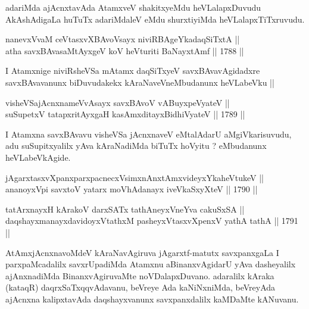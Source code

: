 \begin{artha}
adariMda ajAcnxtavAda AtamxveV shakitxyeMdu heVLalapxDuvudu
AkAshAdigaLa huTuTx adariMdaleV eMdu shurxtiyiMda heVLalapxTiTxruvudu.
\end{artha}



\begin{shl}
nanevxVvaM ceVtasxvXBAvoV\s sayx niviRBAgeYkadaqSiTxtA || \\
atha savxBAvasaMtAyxgeV koV heVturiti BaNayxtAmf ||  1788 ||  
\end{shl}

\begin{artha}
I Atamxnige niviRsheVSa mAtamx daqSiTxyeV savxBAvavAgidadxre
savxBAvavanunx biDuvudakekx kAraNaveVneMbudanunx heVLabeVku ||
\end{artha}

\begin{shl}
visheVSajAcnxnameVvAsayx savxBAvoV vA\s BuyxpeVyateV || \\
suSupetxV tatapxritAyxgaH kasAmxditayxBidhiVyateV ||  1789 ||  
\end{shl}

\begin{artha}
I Atamxna savxBAvavu visheVSa jAcnxnaveV eMtalAdarU aMgiVkarisuvudu,
adu suSupitxyalilx yAva kAraNadiMda biTuTx hoVyitu ? eMbudanunx
heVLabeVkAgide.
\end{artha}


\begin{shl}
jAgarxtasxvXpanxparxpacnecxV\s simxnAnxtAmxvideyxYkaheVtukeV || \\
ananoyxV\s pi savxtoV yatarx moVhAdanayx iveVkaSxyXteV ||  1790 ||  
\end{shl}

\begin{shl}
tatArxnayxH kArakoV darxSATx tathA\s neyxVneYva cakuSxSA || \\
daqshayxmanayxdavidoyxVtathxM pasheyxVtasxvXpenxV yathA tathA ||  1791 ||  
\end{shl}

\begin{artha}
AtAmxjAcnxnavoMdeV kAraNavAgiruva jAgarxtf-matutx savxpanxgaLa I
parxpaMcadalilx savxrUpadiMda Atamxnu aBinanxvAgidarU yAva dasheyalilx
ajAnxnadiMda BinanxvAgiruvaMte noVDalapxDuvano. adaralilx kAraka
(kataqR) daqrxSaTxqqvAdavanu, beVreye Ada kaNiNxniMda, beVreyAda
ajAcnxna kalipxtavAda daqshayxvanunx savxpanxdalilx kaMDaMte kANuvanu.
\end{artha}


